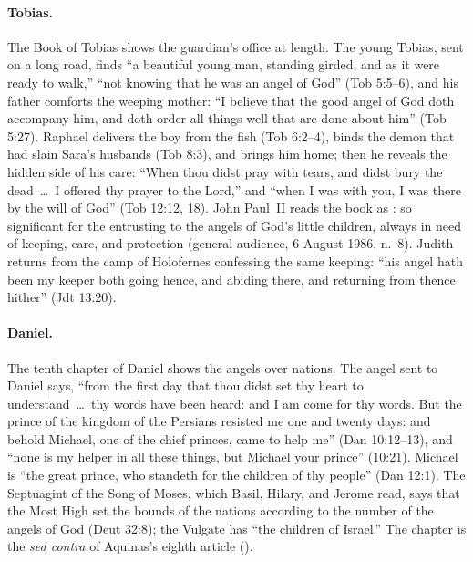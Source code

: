 \paragraph{Tobias.} The Book of Tobias shows the guardian's office at length.
The young Tobias, sent on a long road, finds ``a beautiful young man,
standing girded, and as it were ready to walk,'' ``not knowing that he was
an angel of God'' (Tob 5:5--6), and his father comforts the weeping mother:
``I believe that the good angel of God doth accompany him, and doth order all
things well that are done about him'' (Tob 5:27). Raphael delivers the boy
from the fish (Tob 6:2--4), binds the demon that had slain Sara's husbands
(Tob 8:3), and brings him home; then he reveals the hidden side of his care:
``When thou didst pray with tears, and didst bury the dead~\dots\ I offered
thy prayer to the Lord,'' and ``when I was with you, I was there by the will
of God'' (Tob 12:12, 18). John Paul~II reads the book as : so significant for
the entrusting to the angels of God's little children, always in need of
keeping, care, and protection (general audience, 6 August 1986, n.~8).
Judith returns from the camp of Holofernes confessing the same keeping: ``his
angel hath been my keeper both going hence, and abiding there, and returning
from thence hither'' (Jdt 13:20).

\paragraph{Daniel.} The tenth chapter of Daniel shows the angels over nations.
The angel sent to Daniel says, ``from the first day that thou didst set thy
heart to understand~\dots\ thy words have been heard: and I am come for thy
words. But the prince of the kingdom of the Persians resisted me one and
twenty days: and behold Michael, one of the chief princes, came to help me''
(Dan 10:12--13), and ``none is my helper in all these things, but Michael
your prince'' (10:21). Michael is ``the great prince, who standeth for the
children of thy people'' (Dan 12:1). The Septuagint of the Song of Moses,
which Basil, Hilary, and Jerome read, says that the Most High set the
bounds of the nations according to the number of the angels of God (Deut
32:8); the Vulgate has ``the children of Israel.'' The chapter is the
\emph{sed contra} of Aquinas's eighth article ().

